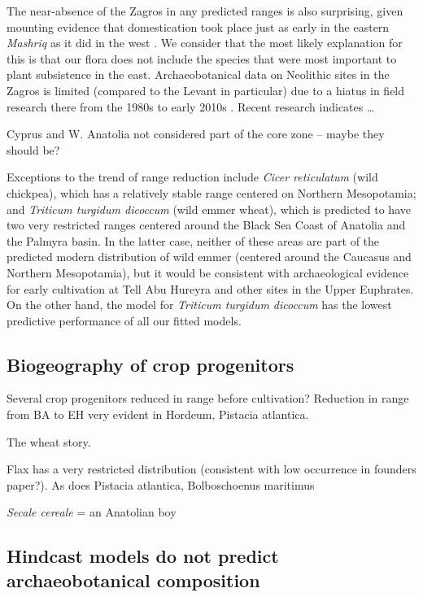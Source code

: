 \documentclass[
  authoryear,
  review]{elsarticle}
\begin{document}
The near-absence of the Zagros in any predicted ranges is also
surprising, given mounting evidence that domestication took place just
as early in the eastern \emph{Mashriq} as it did in the west
\citep{Braidwood, GanjDarehGoats, HillyFlanksStuff}. We consider that
the most likely explanation for this is that our flora does not include
the species that were most important to plant subsistence in the east.
Archaeobotanical data on Neolithic sites in the Zagros is limited
(compared to the Levant in particular) due to a hiatus in field research
there from the 1980s to early 2010s \citep{cite}. Recent research
\citep{Amaia} indicates \ldots{}

Cyprus and W. Anatolia not considered part of the core zone -- maybe
they should be?

Exceptions to the trend of range reduction include \emph{Cicer
reticulatum} (wild chickpea), which has a relatively stable range
centered on Northern Mesopotamia; and \emph{Triticum turgidum dicoccum}
(wild emmer wheat), which is predicted to have two very restricted
ranges centered around the Black Sea Coast of Anatolia and the Palmyra
basin. In the latter case, neither of these areas are part of the
predicted modern distribution of wild emmer (centered around the
Caucasus and Northern Mesopotamia), but it would be consistent with
archaeological evidence for early cultivation at Tell Abu Hureyra and
other sites in the Upper Euphrates. On the other hand, the model for
\emph{Triticum turgidum dicoccum} has the lowest predictive performance
of all our fitted models.

\subsection{Biogeography of crop
progenitors}\label{biogeography-of-crop-progenitors}

Several crop progenitors reduced in range before cultivation? Reduction
in range from BA to EH very evident in Hordeum, Pistacia atlantica.

The wheat story.

Flax has a very restricted distribution (consistent with low occurrence
in founders paper?). As does Pistacia atlantica, Bolboschoenus maritimus

\emph{Secale cereale} = an Anatolian boy

\subsection{Hindcast models do not predict archaeobotanical
composition}\label{hindcast-models-do-not-predict-archaeobotanical-composition}
\end{document}
